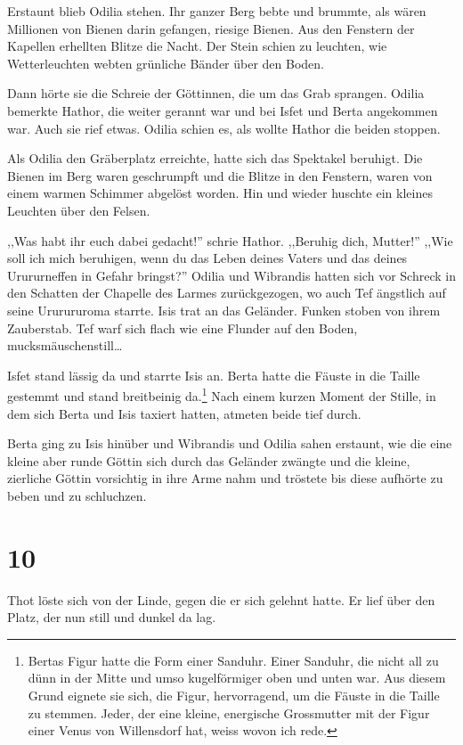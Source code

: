 \documentclass[11pt,titlepage,a5paper]{book}
\begin{document}
Erstaunt blieb Odilia stehen. Ihr ganzer Berg bebte und brummte, als wären Millionen von Bienen darin gefangen, riesige Bienen. Aus den Fenstern der Kapellen erhellten Blitze die Nacht. Der Stein schien zu leuchten, wie Wetterleuchten webten grünliche Bänder über den Boden.

Dann hörte sie die Schreie der Göttinnen, die um das Grab sprangen. Odilia bemerkte Hathor, die weiter gerannt war und bei Isfet und Berta angekommen war. Auch sie rief etwas. Odilia schien es, als wollte Hathor die beiden stoppen.

Als Odilia den Gräberplatz erreichte, hatte sich das Spektakel beruhigt. Die Bienen im Berg waren geschrumpft und die Blitze in den Fenstern, waren von einem warmen Schimmer abgelöst worden. Hin und wieder huschte ein kleines Leuchten über den Felsen.

,,Was habt ihr euch dabei gedacht!'' schrie Hathor. ,,Beruhig dich, Mutter!'' ,,Wie soll ich mich beruhigen, wenn du das Leben deines Vaters und das deines Urururneffen in Gefahr bringst?'' Odilia und Wibrandis hatten sich vor Schreck in den Schatten der Chapelle des Larmes zurückgezogen, wo auch Tef ängstlich auf seine Ururururoma starrte. Isis trat an das Geländer. Funken stoben von ihrem Zauberstab. Tef warf sich flach wie eine Flunder auf den Boden, mucksmäuschenstill\dots

Isfet stand lässig da und starrte Isis an. Berta hatte die Fäuste in die Taille gestemmt und stand breitbeinig da.\footnote{Bertas Figur hatte die Form einer Sanduhr. Einer Sanduhr, die nicht all zu dünn in der Mitte und umso kugelförmiger oben und unten war. Aus diesem Grund eignete sie sich, die Figur, hervorragend, um die Fäuste in die Taille zu stemmen. Jeder, der eine kleine, energische Grossmutter mit der Figur einer Venus von Willensdorf hat, weiss wovon ich rede.} Nach einem kurzen Moment der Stille, in dem sich Berta und Isis taxiert hatten, atmeten beide tief durch.

Berta ging zu Isis hinüber und Wibrandis und Odilia sahen erstaunt, wie die eine kleine aber runde Göttin sich durch das Geländer zwängte und die kleine, zierliche Göttin vorsichtig in ihre Arme nahm und tröstete bis diese aufhörte zu beben und zu schluchzen.

\section*{10}

Thot löste sich von der Linde, gegen die er sich gelehnt hatte. Er lief über den Platz, der nun still und dunkel da lag.
\end{document}
